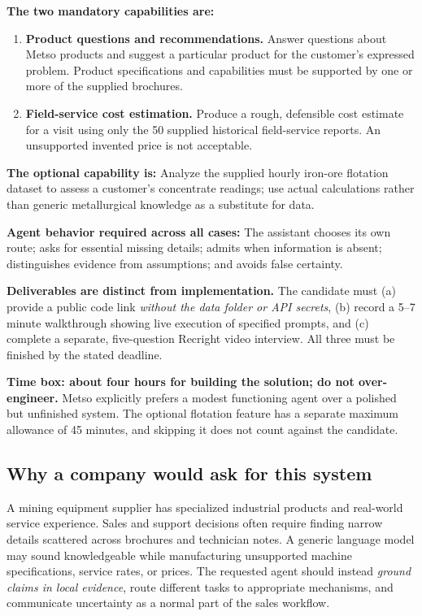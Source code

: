 \documentclass[11pt,a4paper]{article}
\newcommand{\term}[1]{\textbf{#1}}
\begin{document}
\textbf{The two mandatory capabilities are:}
\begin{enumerate}
\item \term{Product questions and recommendations.} Answer questions about Metso products and suggest a particular product for the customer's expressed problem. Product specifications and capabilities must be supported by one or more of the supplied brochures.
\item \term{Field-service cost estimation.} Produce a rough, defensible cost estimate for a visit using only the 50 supplied historical field-service reports. An unsupported invented price is not acceptable.
\end{enumerate}
\textbf{The optional capability is:} Analyze the supplied hourly iron-ore flotation dataset to assess a customer's concentrate readings; use actual calculations rather than generic metallurgical knowledge as a substitute for data.

\textbf{Agent behavior required across all cases:} The assistant chooses its own route; asks for essential missing details; admits when information is absent; distinguishes evidence from assumptions; and avoids false certainty.

\textbf{Deliverables are distinct from implementation.} The candidate must (a) provide a public code link \emph{without the data folder or API secrets}, (b) record a 5--7 minute walkthrough showing live execution of specified prompts, and (c) complete a separate, five-question Recright video interview. All three must be finished by the stated deadline.

\begin{warnbox}
\textbf{Time box: about four hours for building the solution; do not over-engineer.} Metso explicitly prefers a modest functioning agent over a polished but unfinished system. The optional flotation feature has a separate maximum allowance of 45 minutes, and skipping it does not count against the candidate.
\end{warnbox}
\subsection{Why a company would ask for this system}
A mining equipment supplier has specialized industrial products and real-world service experience. Sales and support decisions often require finding narrow details scattered across brochures and technician notes. A generic language model may sound knowledgeable while manufacturing unsupported machine specifications, service rates, or prices. The requested agent should instead \emph{ground claims in local evidence}, route different tasks to appropriate mechanisms, and communicate uncertainty as a normal part of the sales workflow.
\end{document}
